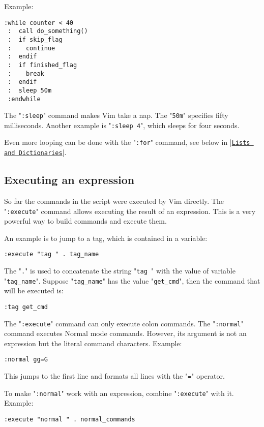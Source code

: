 Example:

\begin{Verbatim}[samepage=true]
 :while counter < 40
 :  call do_something()
 :  if skip_flag
 :    continue
 :  endif
 :  if finished_flag
 :    break
 :  endif
 :  sleep 50m
 :endwhile
\end{Verbatim}

The "\verb!:sleep!" command makes Vim take a nap.
The "\verb!50m!" specifies fifty milliseconds.
Another example is "\verb!:sleep 4!", which sleeps for four seconds.

Even more looping can be done with the "\verb!:for!" command, see below in |\hyperref[Lists and Dictionaries]{\texttt{Lists and Dictionaries}}|.
\subsection{Executing an expression}
So far the commands in the script were executed by Vim directly.
The "\verb!:execute!" command allows executing the result of an expression.
This is a very powerful way to build commands and execute them.

An example is to jump to a tag, which is contained in a variable:

\begin{Verbatim}[samepage=true]
 :execute "tag " . tag_name
\end{Verbatim}

The "\verb!.!" is used to concatenate the string "\verb!tag !" with the value of variable "\verb!tag_name!".
Suppose "\verb!tag_name!" has the value "\verb!get_cmd!", then the command that will be executed is:

\begin{Verbatim}[samepage=true]
 :tag get_cmd
\end{Verbatim}

The "\verb!:execute!" command can only execute colon commands.
The "\verb!:normal!" command executes Normal mode commands.
However, its argument is not an expression but the literal command characters.
Example:

\begin{Verbatim}[samepage=true]
 :normal gg=G
\end{Verbatim}

This jumps to the first line and formats all lines with the "\verb!=!" operator.

To make "\verb!:normal!" work with an expression, combine "\verb!:execute!" with it.
Example:

\begin{Verbatim}[samepage=true]
 :execute "normal " . normal_commands
\end{Verbatim}

